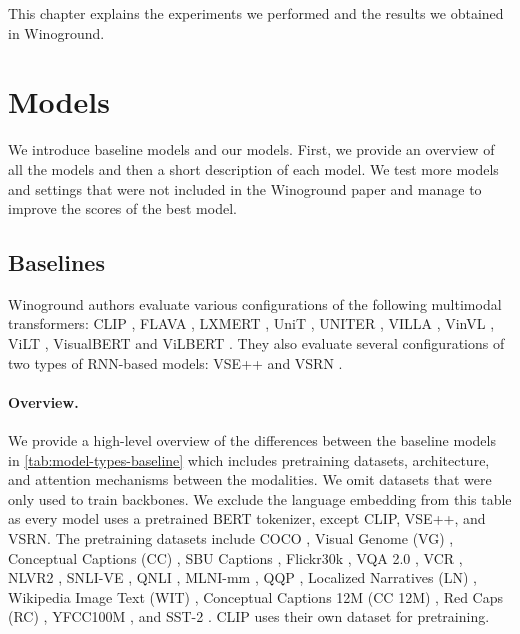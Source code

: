 This chapter explains the experiments we performed and the results we obtained in Winoground.

\section{Models} \label{sec:winoground_models}

We introduce baseline models and our models. First, we provide an overview of all the models and then a short description of each model. We test more models and settings that were not included in the Winoground paper and manage to improve the scores of the best model.

\subsection{Baselines}
Winoground authors \cite{thrush2022winoground} evaluate various configurations of the following multimodal transformers: CLIP \cite{radford2021clip}, FLAVA \cite{singh2022flava}, LXMERT \cite{tan2020lxmert}, UniT \cite{hu2021unit}, UNITER \cite{chen2020uniter}, VILLA \cite{gan2020villa}, VinVL \cite{zhang2021vinvl}, ViLT \cite{kim2021vilt}, VisualBERT \cite{li2019visualbert} and ViLBERT \cite{lu2019vilbert}. They also evaluate several configurations of two types of RNN-based models: VSE++ \cite{faghri2018vse} and VSRN \cite{li2019vsrn}.

\paragraph{Overview.}
We provide a high-level overview of the differences between the baseline models in \cref{tab:model-types-baseline} which includes pretraining datasets, architecture, and attention mechanisms between the modalities. We omit datasets that were only used to train backbones. We exclude the language embedding from this table as every model uses a pretrained BERT tokenizer, except CLIP, VSE++, and VSRN. The pretraining datasets include COCO \cite{lin2014microsoft}, Visual Genome (VG) \cite{krishna2016visual}, Conceptual Captions (CC) \cite{sharma2018conceptual}, SBU Captions \cite{ordonez2011im2text}, Flickr30k \cite{young2014image}, VQA 2.0 \cite{goyal2017making}, VCR \cite{zellers2019recognition}, NLVR2 \cite{suhr2017corpus}, SNLI-VE \cite{xie2018visual}, QNLI \cite{rajpurkar2016squad}, MLNI-mm \cite{williams2017broad}, QQP \cite{QQPDataset}, Localized Narratives (LN) \cite{pont-tuset2020localized-narratives}, Wikipedia Image Text (WIT) \cite{srinivasan2021wit}, Conceptual Captions 12M (CC 12M) \cite{changpinyo2021conceptual12m}, Red Caps (RC) \cite{desai2021redcaps}, YFCC100M \cite{thomee2016yfcc100m}, and SST-2 \cite{Socher2013RecursiveDM}. CLIP uses their own dataset for pretraining.

